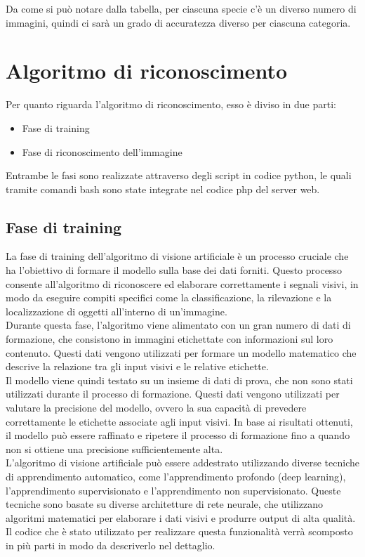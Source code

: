 \documentclass[a4paper,final,12pt]{report}
\begin{document}
Da come si può notare dalla tabella, per ciascuna specie c'è un diverso numero di immagini, quindi ci sarà un grado di accuratezza diverso per ciascuna categoria.

\section{Algoritmo di riconoscimento}
Per quanto riguarda l'algoritmo di riconoscimento, esso è diviso in due parti:
\begin{itemize}
    \item Fase di training
    \item Fase di riconoscimento dell'immagine
\end{itemize}
Entrambe le fasi sono realizzate attraverso degli script in codice python, le quali tramite comandi bash sono state integrate nel codice php del server web.

\subsection{Fase di training}
La fase di training dell'algoritmo di visione artificiale è un processo cruciale che ha l'obiettivo di formare il modello sulla base dei dati forniti. Questo processo consente all'algoritmo di riconoscere ed elaborare correttamente i segnali visivi, in modo da eseguire compiti specifici come la classificazione, la rilevazione e la localizzazione di oggetti all'interno di un'immagine.\\
Durante questa fase, l'algoritmo viene alimentato con un gran numero di dati di formazione, che consistono in immagini etichettate con informazioni sul loro contenuto. Questi dati vengono utilizzati per formare un modello matematico che descrive la relazione tra gli input visivi e le relative etichette.\\
Il modello viene quindi testato su un insieme di dati di prova, che non sono stati utilizzati durante il processo di formazione. Questi dati vengono utilizzati per valutare la precisione del modello, ovvero la sua capacità di prevedere correttamente le etichette associate agli input visivi. In base ai risultati ottenuti, il modello può essere raffinato e ripetere il processo di formazione fino a quando non si ottiene una precisione sufficientemente alta.\\
L'algoritmo di visione artificiale può essere addestrato utilizzando diverse tecniche di apprendimento automatico, come l'apprendimento profondo (deep learning), l'apprendimento supervisionato e l'apprendimento non supervisionato. Queste tecniche sono basate su diverse architetture di rete neurale, che utilizzano algoritmi matematici per elaborare i dati visivi e produrre output di alta qualità.\\
Il codice che è stato utilizzato per realizzare questa funzionalità verrà scomposto in più parti in modo da descriverlo nel dettaglio.
\newpage
\end{document}
